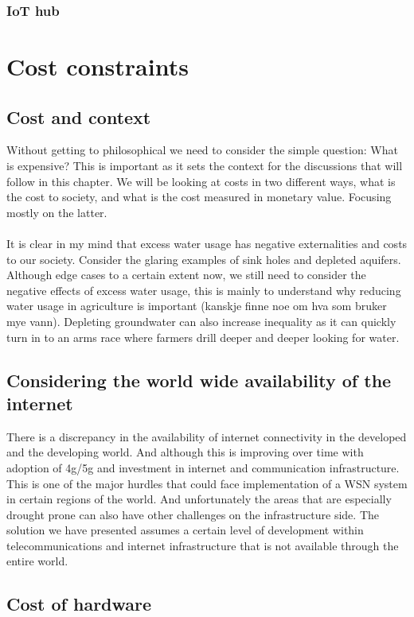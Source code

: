 \documentclass[]{uiophd}
\begin{document}
\subsection{IoT hub}

\chapter{Cost constraints}
\section{Cost and context}
Without getting to philosophical we need to consider the simple question: What is expensive? This is important as it sets the context for the discussions that will follow in this chapter. We will be looking at costs in two different ways, what is the cost to society, and what is the cost measured in monetary value. Focusing mostly on the latter. 
\\\\
It is clear in my mind that excess water usage has negative externalities and costs to our society. Consider the glaring examples of sink holes and depleted aquifers. Although edge cases to a certain extent now, we still need to consider the negative effects of excess water usage, this is mainly to understand why reducing water usage in agriculture is important (kanskje finne noe om hva som bruker mye vann). Depleting groundwater can also increase inequality as it can quickly turn in to an arms race where farmers drill deeper and deeper looking for water.
\section{Considering the world wide availability of the internet}
There is a discrepancy in the availability of internet connectivity in the developed and the developing world. And although this is improving over time with adoption of 4g/5g and investment in internet and communication infrastructure. This is one of the major hurdles that could face implementation of a WSN system in certain regions of the world. And unfortunately the areas that are especially drought prone can also have other challenges on the infrastructure side. The solution we have presented assumes a certain level of development within telecommunications and internet infrastructure that is not available through the entire world.
\section{Cost of hardware}
\end{document}
